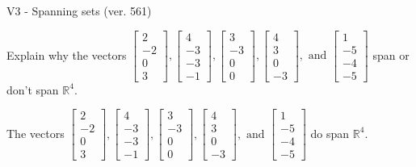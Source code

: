 \begin{exercise}
  \begin{exerciseTitle}V3 - Spanning sets (ver. 561)\end{exerciseTitle}
  \begin{exerciseStatement}
    Explain why the vectors \(\left[\begin{array}{r}
2 \\
-2 \\
0 \\
3
\end{array}\right] , \left[\begin{array}{r}
4 \\
-3 \\
-3 \\
-1
\end{array}\right] , \left[\begin{array}{r}
3 \\
-3 \\
0 \\
0
\end{array}\right] , \left[\begin{array}{r}
4 \\
3 \\
0 \\
-3
\end{array}\right] , \text{ and } \left[\begin{array}{r}
1 \\
-5 \\
-4 \\
-5
\end{array}\right]\) span or don't span \(\mathbb{R}^4\). 
	


  \end{exerciseStatement}
  \begin{exerciseAnswer}
   The vectors \(\left[\begin{array}{r}
2 \\
-2 \\
0 \\
3
\end{array}\right] , \left[\begin{array}{r}
4 \\
-3 \\
-3 \\
-1
\end{array}\right] , \left[\begin{array}{r}
3 \\
-3 \\
0 \\
0
\end{array}\right] , \left[\begin{array}{r}
4 \\
3 \\
0 \\
-3
\end{array}\right] , \text{ and } \left[\begin{array}{r}
1 \\
-5 \\
-4 \\
-5
\end{array}\right]\) 
  	 do  
	span \(\mathbb{R}^4\).
  



\end{exerciseAnswer}
\end{exercise}
